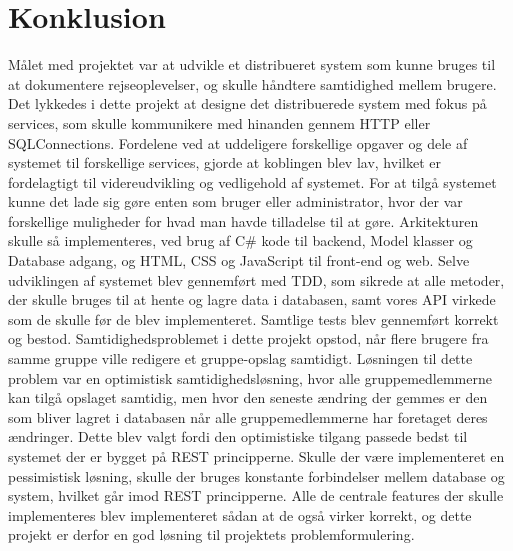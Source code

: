 \chapter{Konklusion}\label{ch:conclusion}
Målet med projektet var at udvikle et distribueret system som kunne bruges til at dokumentere rejseoplevelser, og skulle håndtere samtidighed mellem brugere.
Det lykkedes i dette projekt at designe det distribuerede system med fokus på services, som skulle kommunikere med hinanden gennem HTTP eller SQLConnections. Fordelene ved at uddeligere forskellige opgaver og dele af systemet til forskellige services, gjorde at koblingen blev lav, hvilket er fordelagtigt til videreudvikling og vedligehold af systemet. For at tilgå systemet kunne det lade sig gøre enten som bruger eller administrator, hvor der var forskellige muligheder for hvad man havde tilladelse til at gøre. 
Arkitekturen skulle så implementeres, ved brug af C\# kode til backend, Model klasser og Database adgang, og HTML, CSS og JavaScript til front-end og web. Selve udviklingen af systemet blev gennemført med TDD, som sikrede at alle metoder, der skulle bruges til at hente og lagre data i databasen, samt vores API virkede som de skulle før de blev implementeret. Samtlige tests blev gennemført korrekt og bestod. 
Samtidighedsproblemet i dette projekt opstod, når flere brugere fra samme gruppe ville redigere et gruppe-opslag samtidigt. Løsningen til dette problem var en optimistisk samtidighedsløsning, hvor alle gruppemedlemmerne kan tilgå opslaget samtidig, men hvor den seneste ændring der gemmes er den som bliver lagret i databasen når alle gruppemedlemmerne har foretaget deres ændringer. Dette blev valgt fordi den optimistiske tilgang passede bedst til systemet der er bygget på REST principperne. Skulle der være implementeret en pessimistisk løsning, skulle der bruges konstante forbindelser mellem database og system, hvilket går imod REST principperne.
Alle de centrale features der skulle implementeres blev implementeret sådan at de også virker korrekt, og dette projekt er derfor en god løsning til projektets problemformulering. 